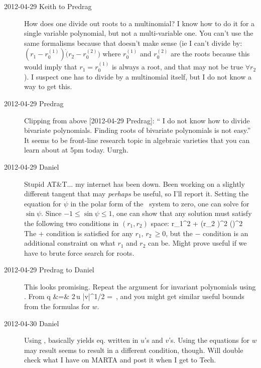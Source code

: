 \begin{description}
\item[2012-04-29 Keith to Predrag] How does one divide out roots
to a multinomial?  I know how to do it for a single variable polynomial,
but not a multi-variable one.  You can't use the same formalisms because
that doesn't make sense (ie I can't divide by:
$(r_1-r_{0}^{(1)})\dot(r_2-r_{0}^{(2)})$ where $r_{0}^{(1)}$ and
$r_{0}^{(2)}$ are the roots because this would imply that $r_1 =
r_{0}^{(1)}$ is always a root, and that may not be true $\forall r_2$).
I suspect one has to divide by a multinomial itself, but I do not know a
way to get this.

\item[2012-04-29 Predrag] Clipping from above [2012-04-29 Predrag]: `` I
do not know how to divide bivariate polynomials. Finding roots of
bivariate polynomials is not easy.'' It seems to be front-line research
topic in algebraic varieties that you can learn about at 5pm today.
Uurgh.

\item[2012-04-29 Daniel] Stupid AT\&T... my internet has been down. Been
working on a slightly different tangent that may \emph{perhaps} be
useful, so I'll report it. Setting the equation for $\dot{\psi}$ in the
polar form of the \twoMode\ system to zero, one can solve for
$\sin{\psi}$. Since $-1 \leq \sin{\psi}\leq 1$, one can show that any
solution must satisfy the following two conditions in $(r_1,r_2)$ space:
\beq
{}r_1^2 + \left(r_2 \pm {}\right)^2
  \geq \left(\right)^2
The $+$ condition is satisfied for any $r_1,\,r_2\,\geq 0$, but the $-$
condition is an additional constraint on what $r_1$ and $r_2$ can be.
Might prove useful if we have to brute force search for roots.

\item[2012-04-29 Predrag to Daniel] This looks promising. Repeat the
argument for invariant polynomials using .
From 
\bea
  q &=&  2\,u |v|^{1/2} \sin \psi = 
  \,,
\label{PKinvEqs7}
\eea
and you might get similar useful bounds from the formulas for $w$.

\item[2012-04-30 Daniel] Using , basically yields eq.  written in $u$'s and $v$'s. Using the equations for $w$ may result seems to result in a different condition, though. Will double check what I have on MARTA and post it when I get to Tech.


\end{description}
